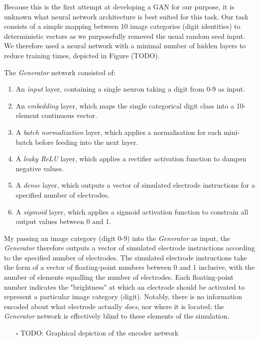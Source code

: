 \documentclass[11pt]{book}
\begin{document}
Because this is the first attempt at developing a GAN for our purpose, it is unknown what neural network architecture is best suited for this task.
Our task consists of a simple mapping between 10 image categories (digit identities) to deterministic vectors as we purposefully removed the usual random seed input.
We therefore used a neural network with a minimal number of hidden layers to reduce training times, depicted in Figure (TODO).

The \emph{Generator} network consisted of:
\begin{enumerate}
\item An \emph{input} layer, containing a single neuron taking a digit from 0-9 as input.
\item An \emph{embedding} layer, which maps the single categorical digit class into a 10-element continuous vector.
\item A \emph{batch normalization} layer, which applies a normalisation for each mini-batch before feeding into the next layer.
\item A \emph{leaky ReLU} layer, which applies a rectifier activation function to dampen negative values.
\item A \emph{dense} layer, which outputs a vector of simulated electrode instructions for a specified number of electrodes.
\item A \emph{sigmoid} layer, which applies a sigmoid activation function to constrain all output values between 0 and 1.
\end{enumerate}

My passing an image category (digit 0-9) into the \emph{Generator} as input, the \emph{Generator} therefore outputs a vector of simulated electrode instructions according to the specified number of electrodes.
The simulated electrode instructions take the form of a vector of floating-point numbers between 0 and 1 inclusive, with the number of elements equalling the number of electrodes.
Each floating-point number indicates the "brightness" at which an electrode should be activated to represent a particular image category (digit).
Notably, there is no information encoded about what electrode actually \emph{does}, nor where it is located; the \emph{Generator} network is effectively blind to these elements of the simulation.

\begin{enumerate}
\item[{$\square$}] TODO: Graphical depiction of the encoder network
\end{enumerate}
\end{document}
